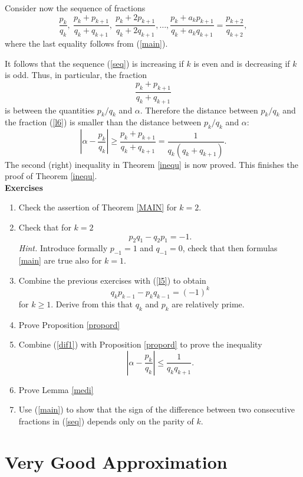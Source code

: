 \documentclass[12pt,letterpaper]{book}
\begin{document}
Consider now the sequence of fractions
\begin{equation} \label{seq}
\frac{p_k}{q_k}, \ \frac{p_k+p_{k+1}}{q_k+q_{k+1}}, \
\frac{p_k+2p_{k+1}}{q_k+2q_{k+1}}, \ldots,
\frac{p_k+a_kp_{k+1}}{q_k+a_kq_{k+1}}=\frac{p_{k+2}}{q_{k+2}},
\end{equation}
where the last equality follows from (\ref{main}).


It follows that the sequence  (\ref{seq}) is increasing if $k$ is
even and is decreasing if $k$ is odd. Thus, in particular, the
fraction
\begin{equation} \label{l6}
\frac{p_k+p_{k+1}}{q_k+q_{k+1}}
\end{equation}
is between the quantities $p_k/q_k$ and $\alpha$. Therefore the
distance between
 $p_k/q_k$  and the fraction (\ref{l6}) is smaller than the distance
between  $p_k/q_k$ and $\alpha$:
$$
\left\vert \alpha - \frac{p_k}{q_k} \right\vert \geq
\frac{p_k+p_{k+1}}{q_k+q_{k+1}} = \frac{1}{q_k(q_k + q_{k+1})}.
$$
The second (right) inequality in Theorem \ref{inequ} is now
proved. This finishes the proof of Theorem \ref{inequ}.\\
\textbf{Exercises}
\begin{enumerate}
\item{Check the assertion of Theorem \ref{MAIN} for $k=2$.}\item{
Check that for $k=2$
$$
p_2q_1 - q_2p_1 = -1.
$$
{\sl Hint.} Introduce formally $p_{-1}=1$ and $q_{-1}=0$, check that
then formulas \ref{main} are true also for $k=1$.}

\item{ Combine the previous exercises with (\ref{l5}) to obtain
$$
q_kp_{k-1}-p_kq_{k-1} = (-1)^k
$$
for $k \geq 1$. Derive from this that  $q_k$ and $p_k$ are
relatively prime. }\item{Prove Proposition \ref{propord}}\item{
Combine (\ref{dif1}) with Proposition \ref{propord} to prove the
inequality
$$
\left\vert \alpha - \frac{p_k}{q_k} \right\vert \leq
\frac{1}{q_kq_{k+1}}.
$$
} \item{Prove Lemma \ref{medi}}\item{Use (\ref{main}) to show that
the sign of the difference between two consecutive fractions in
(\ref{seq}) depends only on the parity of $k$.}
\end{enumerate}
\section{Very Good Approximation}
\end{document}

